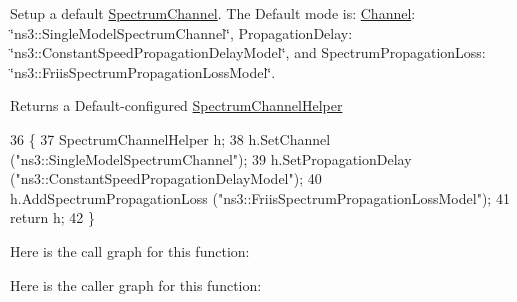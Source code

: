 Setup a default \hyperlink{classns3_1_1SpectrumChannel}{Spectrum\+Channel}. The Default mode is\+: \hyperlink{classns3_1_1Channel}{Channel}\+: \char`\"{}ns3\+::\+Single\+Model\+Spectrum\+Channel\char`\"{}, Propagation\+Delay\+: \char`\"{}ns3\+::\+Constant\+Speed\+Propagation\+Delay\+Model\char`\"{}, and Spectrum\+Propagation\+Loss\+: \char`\"{}ns3\+::\+Friis\+Spectrum\+Propagation\+Loss\+Model\char`\"{}. 

\begin{DoxyReturn}{Returns}
a Default-\/configured \hyperlink{classns3_1_1SpectrumChannelHelper}{Spectrum\+Channel\+Helper} 
\end{DoxyReturn}

\begin{DoxyCode}
36 \{
37   SpectrumChannelHelper h;
38   h.SetChannel (\textcolor{stringliteral}{"ns3::SingleModelSpectrumChannel"});
39   h.SetPropagationDelay (\textcolor{stringliteral}{"ns3::ConstantSpeedPropagationDelayModel"});
40   h.AddSpectrumPropagationLoss (\textcolor{stringliteral}{"ns3::FriisSpectrumPropagationLossModel"});
41   \textcolor{keywordflow}{return} h;
42 \}
\end{DoxyCode}


Here is the call graph for this function\+:




Here is the caller graph for this function\+:


